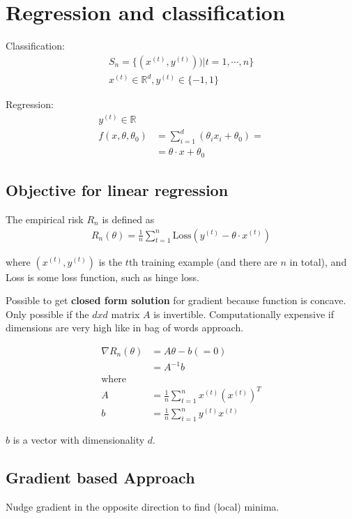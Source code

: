 \section{Regression and classification}

Classification:
\begin{align*}
S_n = \{(x^{(t)},y^{(t)}))|t=1,\cdots,n\}\\
x^{(t)} \in \mathbb{R}^d, y^{(t)} \in \{-1,1\}
\end{align*}

Regression:
\begin{align*}
y^{(t)} \in \mathbb{R}\\
f(x,\theta,\theta_0) &= \sum_{i=1}^d (\theta_i x_i + \theta_0) = \\
&=\theta \cdot x + \theta_0
\end{align*}

\subsection{Objective for linear regression}

The empirical risk  $R_n$  is defined as
\begin{align*}
R_ n(\theta ) = \frac{1}{n} \sum _{t=1}^{n} \text {Loss}(y^{(t)} - \theta \cdot x^{(t)})
\end{align*}

where  $(x^{(t)},y^{(t)})$  is the  $t$th training example (and there are $n$ in total), and  Loss  is some loss function, such as hinge loss.

Possible to get \textbf{closed form solution} for gradient because function is concave. Only possible if the $dxd$ matrix $A$ is invertible. Computationally expensive if dimensions are very high like in bag of words approach.

\begin{align*}
\nabla R_ n(\theta ) &= A\theta - b (=0)\\
&= A^{-1}b\\
\text {where } \\
A &= \frac{1}{n} \sum _{t=1}^{n} x^{(t)} ( x^{(t)})^ T\\
b &= \frac{1}{n} \sum _{t=1}^{n} y^{(t)} x^{(t)}
\end{align*}

$b$ is a vector with dimensionality $d$.
\subsection{Gradient based Approach}
Nudge gradient in the opposite direction to find (local) minima.

